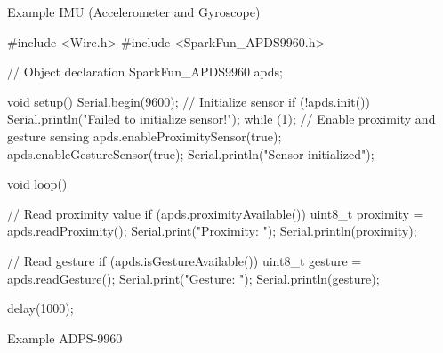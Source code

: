 \begin{code}
\caption{Example IMU (Accelerometer and Gyroscope)}

\end{code}

\begin{code}
    \begin{Arduino}
#include <Wire.h>
#include <SparkFun_APDS9960.h>
    
// Object declaration
SparkFun_APDS9960 apds;
    
void setup() {
  Serial.begin(9600);
  // Initialize sensor
  if (!apds.init()) {
    Serial.println("Failed to initialize sensor!");
    while (1);
  }
  // Enable proximity and gesture sensing
  apds.enableProximitySensor(true);
  apds.enableGestureSensor(true);
  Serial.println("Sensor initialized");
}
    
void loop() {
  // Read proximity value
  if (apds.proximityAvailable()) {
    uint8_t proximity = apds.readProximity();
    Serial.print("Proximity: ");
    Serial.println(proximity);
  }
         
  // Read gesture
  if (apds.isGestureAvailable()) {
    uint8_t gesture = apds.readGesture();
    Serial.print("Gesture: ");
    Serial.println(gesture);
  }
        
  delay(1000);
}

\end{Arduino}
\caption{Example ADPS-9960}

\end{code}

